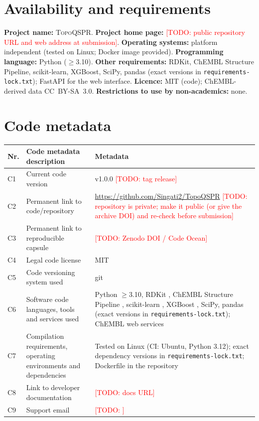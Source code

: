 \documentclass[preprint,12pt]{elsarticle}
\newcommand{\todo}[1]{\textcolor{red}{[TODO: #1]}}
\newcommand{\ml}{\textsc{TopoQSPR}}
\begin{document}
\section*{Availability and requirements}
\textbf{Project name:} \ml. \textbf{Project home page:} \todo{public repository URL and web address at submission}. \textbf{Operating systems:} platform independent (tested on Linux; Docker image provided). \textbf{Programming language:} Python ($\ge$3.10). \textbf{Other requirements:} RDKit, ChEMBL Structure Pipeline, scikit-learn, XGBoost, SciPy, pandas (exact versions in \texttt{requirements-lock.txt}); FastAPI for the web interface. \textbf{Licence:} MIT (code); ChEMBL-derived data CC~BY-SA~3.0. \textbf{Restrictions to use by non-academics:} none.

\section*{Code metadata}
\begin{table}[h]
\small
\begin{tabularx}{\linewidth}{lXX}
\toprule
Nr. & Code metadata description & Metadata \\
\midrule
C1 & Current code version & v1.0.0 \todo{tag release} \\
C2 & Permanent link to code/repository & \url{https://github.com/Singati2/TopoQSPR} \todo{repository is private; make it public (or give the archive DOI) and re-check before submission} \\
C3 & Permanent link to reproducible capsule & \todo{Zenodo DOI / Code Ocean} \\
C4 & Legal code license & MIT \\
C5 & Code versioning system used & git \\
C6 & Software code languages, tools and services used & Python $\ge$3.10, RDKit \cite{rdkit}, ChEMBL Structure Pipeline \cite{bento2020open}, scikit-learn \cite{pedregosa2011}, XGBoost \cite{chen2016xgboost}, SciPy, pandas (exact versions in \texttt{requirements-lock.txt}); ChEMBL web services \\
C7 & Compilation requirements, operating environments and dependencies & Tested on Linux (CI: Ubuntu, Python 3.12); exact dependency versions in \texttt{requirements-lock.txt}; Dockerfile in the repository \\
C8 & Link to developer documentation & \todo{docs URL} \\
C9 & Support email & \todo{} \\
\bottomrule
\end{tabularx}
\end{table}
\end{document}
